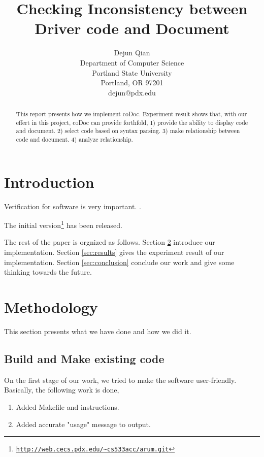 \documentclass[11pt,letterpaper,oneside]{article}
\title{Checking Inconsistency between Driver code and Document}
\author{Dejun Qian\\Department of Computer Science\\Portland State University\\Portland, OR 97201\\dejun@pdx.edu}
\begin{document}
\maketitle

\begin{abstract}
This report presents how we implement coDoc. 
Experiment result shows that, with our effert in this project, coDoc can provide forthfold, 
1) provide the ability to display code and document. 
2) select code based on syntax parsing.
3) make relationship between code and document.
4) analyze relationship.
\end{abstract}

\section{Introduction}
\label{sec:introduction}
Verification for software is very important. \cite{xiao_automated_2012}.

The initial version\footnote{\texttt{\url{http://web.cecs.pdx.edu/~cs533acc/arum.git}}} has been released.

The rest of the paper is orgnized as follows. 
Section \ref{sec:methodology} introduce our implementation.
Section \ref{sec:results} gives the experiment result of our implementation. 
Section \ref{sec:conclusion} conclude our work and give some thinking towards the future.

\section{Methodology}
\label{sec:methodology}
This section presents what we have done and how we did it.

\subsection{Build and Make existing code}
On the first stage of our work, we tried to make the software user-friendly. Basically, the following work is done,
\begin{enumerate}
\item Added Makefile and instructions.
\item Added accurate "usage" message to output.
\end{enumerate}
\end{document}
